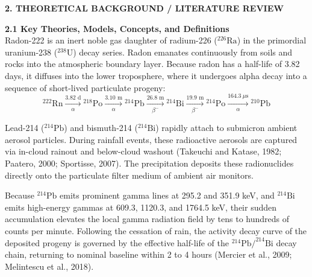 \documentclass[11pt,a4paper]{article}
\begin{document}
\begin{framed}
\noindent\textbf{2. THEORETICAL BACKGROUND / LITERATURE REVIEW}\\[0.6em]
\noindent\textbf{2.1 Key Theories, Models, Concepts, and Definitions}\\[0.3em]
Radon-222 is an inert noble gas daughter of radium-226 ($^{226}\text{Ra}$) in the primordial uranium-238 ($^{238}\text{U}$) decay series. Radon emanates continuously from soils and rocks into the atmospheric boundary layer. Because radon has a half-life of 3.82 days, it diffuses into the lower troposphere, where it undergoes alpha decay into a sequence of short-lived particulate progeny:
\begin{equation}
    ^{222}\text{Rn} \xrightarrow[\alpha]{3.82\text{ d}} {}^{218}\text{Po} \xrightarrow[\alpha]{3.10\text{ m}} {}^{214}\text{Pb} \xrightarrow[\beta^-]{26.8\text{ m}} {}^{214}\text{Bi} \xrightarrow[\beta^-]{19.9\text{ m}} {}^{214}\text{Po} \xrightarrow[\alpha]{164.3\ \mu\text{s}} {}^{210}\text{Pb}
\end{equation}

Lead-214 ($^{214}\text{Pb}$) and bismuth-214 ($^{214}\text{Bi}$) rapidly attach to submicron ambient aerosol particles. During rainfall events, these radioactive aerosols are captured via in-cloud rainout and below-cloud washout (Takeuchi and Katase, 1982; Paatero, 2000; Sportisse, 2007). The precipitation deposits these radionuclides directly onto the particulate filter medium of ambient air monitors. 

Because $^{214}\text{Pb}$ emits prominent gamma lines at 295.2 and 351.9 keV, and $^{214}\text{Bi}$ emits high-energy gammas at 609.3, 1120.3, and 1764.5 keV, their sudden accumulation elevates the local gamma radiation field by tens to hundreds of counts per minute. Following the cessation of rain, the activity decay curve of the deposited progeny is governed by the effective half-life of the $^{214}\text{Pb}/^{214}\text{Bi}$ decay chain, returning to nominal baseline within 2 to 4 hours (Mercier et al., 2009; Melintescu et al., 2018).


\end{framed}
\end{document}
